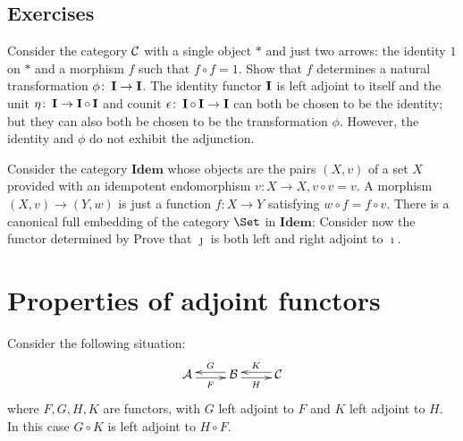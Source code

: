 \subsection{Exercises}
  \begin{ex}
    Consider the category ${\cal C}$ with a single object $\ast$ and just two arrows: the identity $1$ on $\ast$ and a morphism $f$ such that $f \circ f = 1$. Show that $f$ determines a natural transformation $\phi\colon\operatorname{\mathbf{I}}\to\operatorname{\mathbf{I}}$. The identity functor $\operatorname{\mathbf{I}}$ is left adjoint to itself and the unit $\eta\colon\operatorname{\mathbf{I}}\to\operatorname{\mathbf{I}}\circ\operatorname{\mathbf{I}}$ and counit $\epsilon\colon\operatorname{\mathbf{I}}\circ\operatorname{\mathbf{I}}\to\operatorname{\mathbf{I}}$ can both be chosen to be the identity; but they can also both be chosen to be the transformation $\phi$. However, the identity and $\phi$ do not exhibit the adjunction.
  \end{ex}
  \begin{ex}
    Consider the category $\mathbf{Idem}$ whose objects are the pairs $(X,v)$ of a set $X$ provided with an idempotent endomorphism $v\colon X\to X, v\circ v=v$. A morphism $(X, v) \to (Y, w)$ is just a function $f\colon X \to Y$ satisfying $w\circ f = f\circ v$.
    There is a canonical full embedding of the category $\Set$ in $\mathbf{Idem}$:
    Consider now the functor determined by
    Prove that $\jmath$ is both left and right adjoint to $\imath$.
  \end{ex}


\newpage\section{Properties of adjoint functors}
  \begin{prop}
    Consider the following situation:
      \begin{displaymath}
        \xymatrix{
          \Aa\ar@<-0.5ex>[r]_{F}&\Bb\ar@<-0.5ex>[l]_{G}\ar@<-0.5ex>[r]_{H}&\Cc\ar@<-0.5ex>[l]_{K}
         }
      \end{displaymath}
  where $F,G,H,K$ are functors, with $G$ left adjoint to $F$ and $K$ left adjoint to $H$. In this case $G\circ K$ is left adjoint to $H\circ F$.
  \end{prop}

